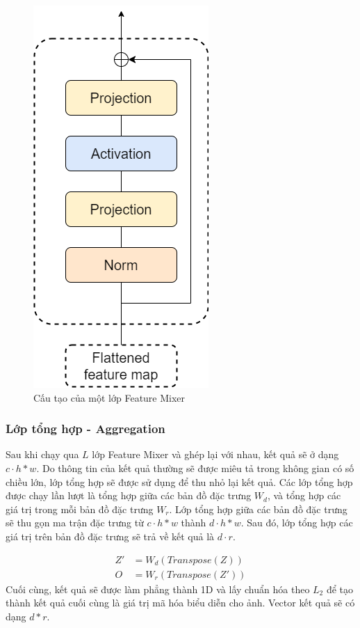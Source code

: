 \begin{figure}[H]
  \centering
  \includegraphics[scale=0.6]{pics/Proposal/mixer.png}
  \caption{Cấu tạo của một lớp Feature Mixer \cite{alibey2023mixvpr}}
\end{figure}

\subsubsection{Lớp tổng hợp - Aggregation}

Sau khi chạy qua $L$ lớp Feature Mixer và ghép lại với nhau, kết quả sẽ ở dạng $c \cdot h*w$. Do thông tin của kết quả thường sẽ được miêu tả trong không gian có số chiều lớn, lớp tổng hợp sẽ được sử dụng để thu nhỏ lại kết quả. Các lớp tổng hợp được chạy lần lượt là tổng hợp giữa các bản đồ đặc trưng $W_d$, và tổng hợp các giá trị trong mỗi bản đồ đặc trưng $W_r$. Lớp tổng hợp giữa các bản đồ đặc trưng sẽ thu gọn ma trận đặc trưng từ $c \cdot h*w$ thành $d \cdot h*w$. Sau đó, lớp tổng hợp các giá trị trên bản đồ đặc trưng sẽ trả về kết quả là $d \cdot r$.

$$
  \begin{aligned}
    Z' & = W_d(Transpose(Z)) \\
    O  & = W_r(Transpose(Z'))
  \end{aligned}
$$
\newpage
Cuối cùng, kết quả sẽ được làm phẳng thành 1D và lấy chuẩn hóa theo $L_2$ để tạo thành kết quả cuối cùng là giá trị mã hóa biểu diễn cho ảnh. Vector kết quả sẽ có dạng $d*r$.

